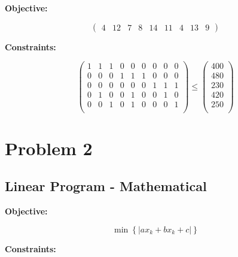 \documentclass[12pt,letterpaper]{article}
\begin{document}
\textbf{Objective:}

\[ \left( \begin{array}{ccccccccc}
4 & 12 & 7 & 8 & 14 & 11 & 4 & 13 & 9 \end{array} \right)\]

\textbf{Constraints:}

\[ \left( \begin{array}{ccccccccc}
1 & 1 & 1 & 0 & 0 & 0 & 0 & 0 & 0 \\
0 & 0 & 0 & 1 & 1 & 1 & 0 & 0 & 0 \\
0 & 0 & 0 & 0 & 0 & 0 & 1 & 1 & 1 \\
0 & 1 & 0 & 0 & 1 & 0 & 0 & 1 & 0 \\
0 & 0 & 1 & 0 & 1 & 0 & 0 & 0 & 1 \\
\end{array} \right)
\leq
 \left( \begin{array}{c}
400 \\
480 \\
230 \\
420 \\
250 \\
\end{array} \right) \]

\section*{Problem 2}

\subsection*{Linear Program - Mathematical}

\textbf{Objective:}


$$
\min \left \{ |ax_k+bx_k + c| \right \}
$$

\textbf{Constraints:}
\end{document}
